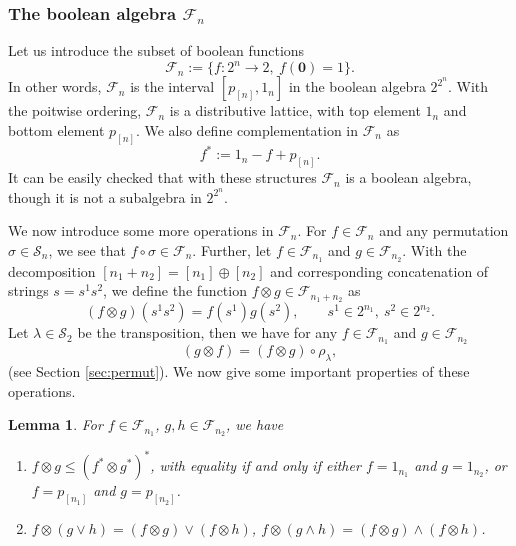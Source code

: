 \documentclass[12pt]{article}
\newtheorem{lemma}{Lemma}
\theoremstyle{definition}
\theoremstyle{remark}
\def\Fe{\mathcal F}
\def\permut{\mathscr{S}}
\begin{document}
\subsubsection{The boolean algebra $\Fe_n$}


Let us introduce the subset of boolean functions 
\[
\Fe_n:=\{f:2^n\to 2,\ f(\mathbf{0})=1\}.
\]
In other words, $\Fe_n$ is the interval $[p_{[n]},1_n]$ in the boolean algebra $2^{2^n}$. 
With the poitwise ordering, $\Fe_n$ is a distributive lattice, with top element $1_n$ and 
 bottom element $p_{[n]}$. We also define complementation  in $\Fe_n$ as
\[
f^*:=1_n-f+p_{[n]}.
\]
It can be easily checked that with these structures $\Fe_n$ is a boolean algebra, though
it is not a subalgebra in $2^{2^n}$.

We now introduce some more operations in $\Fe_n$. For $f\in \Fe_n$ and any permutation
$\sigma\in \permut_n$, we see that $f\circ \sigma\in \Fe_n$.
Further, let $f\in \Fe_{n_1}$ and $g\in \Fe_{n_2}$. With the decomposition
$[n_1+n_2]=[n_1]\oplus [n_2]$
and corresponding concatenation of strings $s=s^1s^2$,  we define
the function $f\otimes g\in \Fe_{n_1+n_2}$ as
\[
(f\otimes g)(s^1s^2)=f(s^1)g(s^2),\qquad s^1\in 2^{n_1},\ s^2\in 2^{n_2}.
\]
Let $\lambda\in \permut_2$ be the transposition, then we have for any $f\in \Fe_{n_1}$ and
$g\in \Fe_{n_2}$
\[
(g\otimes f)=(f\otimes g)\circ \rho_\lambda,
\]
(see Section \ref{sec:permut}).
We now give some important properties of these operations.

\begin{lemma}\label{lemma:fproduct} For $f\in \Fe_{n_1}$, $g,h\in \Fe_{n_2}$, we have
\begin{enumerate}
\item[(i)] $f\otimes g\le (f^*\otimes g^*)^*$, with equality if and only if either
$f=1_{n_1}$ and $g=1_{n_2}$, or $f=p_{[n_1]}$ and $g=p_{[n_2]}$.
\item[(ii)] $f\otimes (g\vee h)= (f\otimes g)\vee (f\otimes h)$, $f\otimes (g\wedge h)=
(f\otimes g)\wedge (f\otimes h)$.
\end{enumerate}

\end{lemma}
\end{document}
